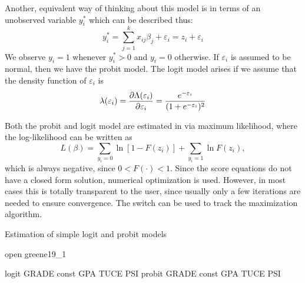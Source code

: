 Another, equivalent way of thinking about this model is in terms of
an unobserved variable $y^*_i$ which can be described thus:
%
\begin{equation}
  \label{eq:qr-latent}
  y^*_i = \sum_{j=1}^k x_{ij} \beta_j + \varepsilon_i = z_i  +
  \varepsilon_i 
\end{equation}
%
We observe $y_i = 1$ whenever $y^*_i > 0$ and $y_i = 0$ otherwise. If
$\varepsilon_i$ is assumed to be normal, then we have the probit
model. The logit model arises if we assume that the density function
of $\varepsilon_i$ is
%
\[
  \lambda(\varepsilon_i) =
  \frac{\partial \Lambda(\varepsilon_i)}{\partial \varepsilon_i} =
  \frac{e^{-\varepsilon_i}}{(1 + e^{-\varepsilon_i})^2}
\]

Both the probit and logit model are estimated in  via
maximum likelihood, where the log-likelihood can be written as
\begin{equation}
  \label{eq:qr-loglik}
  L(\beta) = \sum_{y_i=0} \ln [ 1 - F(z_i)] + \sum_{y_i=1} \ln F(z_i),
\end{equation}
which is always negative, since $0 < F(\cdot) < 1$.  Since the score
equations do not have a closed form solution, numerical optimization
is used. However, in most cases this is totally transparent to the
user, since usually only a few iterations are needed to ensure
convergence. The  switch can be used to track the
maximization algorithm.

\begin{script}[htbp]
  \caption{Estimation of simple logit and probit models}
  \label{simple-QR}
\begin{scode}
open greene19_1

logit GRADE const GPA TUCE PSI
probit GRADE const GPA TUCE PSI
\end{scode}
\end{script}

